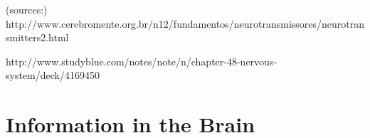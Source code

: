 \documentclass{beamer}
\begin{document}
\begin{frame}
\begin{figure}
\begin{minipage}{0.45\linewidth}
\end{minipage}
\end{figure}



\vfill
\fontsize{6pt}{6pt}\selectfont 
(sources:) http://www.cerebromente.org.br/n12/fundamentos/neurotransmissores/neurotransmitters2.html

http://www.studyblue.com/notes/note/n/chapter-48-nervous-system/deck/4169450

\end{frame}

















\section{Information in the Brain}
\end{document}
